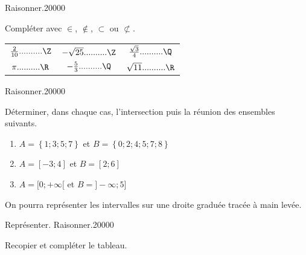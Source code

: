 \begin{pageAuto}

\begin{ExoAutoN}{Raisonner.}{2}{0}{0}{0}{0}

Compléter avec $\in$, $\not\in$, $\subset$ ou $\not\subset$.

 \begin{tabular}{ccc}

$\frac{2}{10}..........\Z$ & $-\sqrt{25}..........\Z$ & $\frac{\sqrt{3}}{4}..........\Q$ \\ 

$\pi..........\R$  & $-\frac{5}{3}..........\Q$  &  $\sqrt{11}..........\R$ \\ 

\end{tabular} 

\end{ExoAutoN}
\begin{ExoAutoN}{Raisonner.}{2}{0}{0}{0}{0}
 

Déterminer, dans chaque cas, l'intersection puis la réunion des ensembles suivants. 

\begin{enumerate}
\item $A=\left\lbrace 1;3;5;7  \right\rbrace $ et $B=\left\lbrace 0;2;4;5;7;8  \right\rbrace $
\item $A=[-3;4]$ et $B=[2;6]$
\item $A=[0;+\infty[$ et $B=]-\infty;5]$
\end{enumerate}
On pourra représenter les intervalles sur une droite graduée tracée à main levée.
 
 

\end{ExoAutoN}
\begin{ExoAutoN}{Représenter. Raisonner.}{2}{0}{0}{0}{0}

 Recopier et compléter le tableau.


\end{ExoAutoN}
\end{pageAuto}
